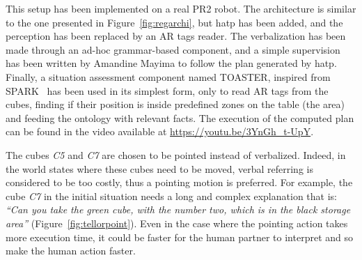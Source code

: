 \documentclass[a4paper,11pt,twoside]{StyleThese}
\begin{document}
This setup has been implemented on a real PR2 robot. The architecture is similar to the one presented in Figure~\ref{fig:regarchi}, but \acrshort{hatp} has been added, and the perception has been replaced by an AR tags reader. The verbalization has been made through an ad-hoc grammar-based component, and a simple supervision has been written by Amandine Mayima to follow the plan generated by \acrshort{hatp}. Finally, a situation assessment component named TOASTER, inspired from SPARK~\cite{milliez2014framework} has been used in its simplest form, only to read AR tags from the cubes, finding if their position is inside predefined zones on the table (the area) and feeding the ontology with relevant facts. The execution of the computed plan can be found in the video available at \url{https://youtu.be/3YnGh\_t-UpY}. 

The cubes \textit{C5} and \textit{C7} are chosen to be pointed instead of verbalized. Indeed, in the world states where these cubes need to be moved, verbal referring is considered to be too costly, thus a pointing motion is preferred. For example, the cube \textit{C7} in the initial situation needs a long and complex explanation that is: \textit{``Can you take the green cube, with the number two, which is in the black storage area''} (Figure~\ref{fig:tellorpoint}). Even in the case where the pointing action takes more execution time, it could be faster for the human partner to interpret and so make the human action faster.
\end{document}
